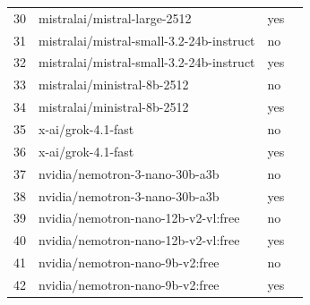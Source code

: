 \begin{table}[ht]
\begin{tabular}{rllc}
30 & mistralai/mistral-large-2512 & yes \\
31 & mistralai/mistral-small-3.2-24b-instruct & no \\
32 & mistralai/mistral-small-3.2-24b-instruct & yes \\
33 & mistralai/ministral-8b-2512 & no \\
34 & mistralai/ministral-8b-2512 & yes \\
35 & x-ai/grok-4.1-fast & no \\
36 & x-ai/grok-4.1-fast & yes \\
37 & nvidia/nemotron-3-nano-30b-a3b & no \\
38 & nvidia/nemotron-3-nano-30b-a3b & yes \\
39 & nvidia/nemotron-nano-12b-v2-vl:free & no \\
40 & nvidia/nemotron-nano-12b-v2-vl:free & yes \\
41 & nvidia/nemotron-nano-9b-v2:free & no \\
42 & nvidia/nemotron-nano-9b-v2:free & yes \\
\hline
\end{tabular}
\end{table}